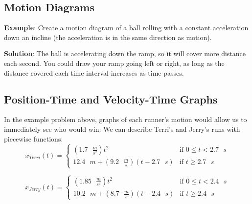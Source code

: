 \subsection{Motion Diagrams}

\textbf{Example}: Create a motion diagram of a ball rolling with a constant 
acceleration down an incline (the acceleration is in the same direction as 
motion). 

\textbf{Solution}: The ball is accelerating down the ramp, so it will cover 
more distance each second. You could draw your ramp going left or right, as 
long as the distance covered each time interval increases as time passes. 

\begin{center}
\end{center}

\subsection{Position-Time and Velocity-Time Graphs}


In the example problem above, graphs of each runner's motion would allow us to 
immediately see who would win. We can describe Terri's and Jerry's runs with 
piecewise functions:
$$x_{Terri}(t) = \begin{cases}
\left( 1.7 \text{ } \frac{m}{s^2} \right)t^2 & \text{if } 0 \leq t < 2.7 
\text{ }s\\
12.4 \text{ } m + \left( 9.2 \text{ } \frac{m}{s} \right) \left( t - 2.7 \text{ } 
s \right) & \text{if } t \geq 2.7 \text{ }s
\end{cases}$$

$$x_{Jerry}(t) = \begin{cases}
\left( 1.85 \text{ } \frac{m}{s^2} \right)t^2 & \text{if } 0 \leq t < 2.4 
\text{ }s\\
10.2 \text{ }m + \left( 8.7 \text{ }\frac{m}{s} \right) \left(t - 2.4 \text{ }s 
\right) & \text{if } t \geq 2.4 \text{ }s
\end{cases}$$

